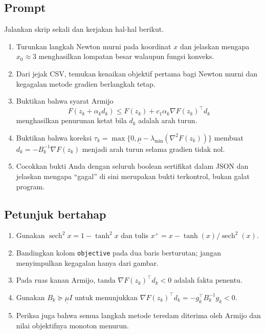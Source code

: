 \subsection*{Prompt}
\begin{exercise}
Jalankan skrip sekali dan kerjakan hal-hal berikut.
\begin{enumerate}
  \item Turunkan langkah Newton murni pada koordinat $x$ dan jelaskan mengapa
    $x_0\approx3$ menghasilkan lompatan besar walaupun fungsi konveks.
  \item Dari jejak CSV, temukan kenaikan objektif pertama bagi Newton murni
    dan kegagalan metode gradien berlangkah tetap.
  \item Buktikan bahwa syarat Armijo
    \[
      F(z_k+\alpha_kd_k)\leq F(z_k)+c_1\alpha_k
      \nabla F(z_k)^\top d_k
    \]
    menghasilkan penurunan ketat bila $d_k$ adalah arah turun.
  \item Buktikan bahwa koreksi
    $\tau_k=\max\{0,\underline\mu-\lambda_{\min}(\nabla^2F(z_k))\}$
    membuat $d_k=-B_k^{-1}\nabla F(z_k)$ menjadi arah turun selama
    gradien tidak nol.
  \item Cocokkan bukti Anda dengan seluruh boolean sertifikat dalam JSON dan
    jelaskan mengapa ``gagal'' di sini merupakan bukti terkontrol, bukan
    galat program.
\end{enumerate}
\end{exercise}

\subsection*{Petunjuk bertahap}
\label{orig03:lab:hint:0003}
\begin{enumerate}
  \item Gunakan $\operatorname{sech}^2x=1-\tanh^2x$ dan tulis
    $x^+=x-\tanh(x)/\operatorname{sech}^2(x)$.
  \item Bandingkan kolom \texttt{objective} pada dua baris berturutan; jangan
    menyimpulkan kegagalan hanya dari gambar.
  \item Pada ruas kanan Armijo, tanda
    $\nabla F(z_k)^\top d_k<0$ adalah fakta penentu.
  \item Gunakan $B_k\succeq\underline\mu I$ untuk menunjukkan
    $\nabla F(z_k)^\top d_k=-g_k^\top B_k^{-1}g_k<0$.
  \item Periksa juga bahwa semua langkah metode teredam diterima oleh Armijo
    dan nilai objektifnya monoton menurun.
\end{enumerate}

